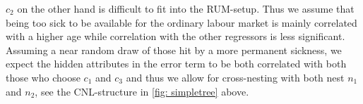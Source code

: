 $c_2$ on the other hand is difficult to fit into the RUM-setup. Thus we assume that being too sick to be available for the ordinary labour market is mainly correlated with a higher age while correlation with the other regressors is less significant. Assuming a near random draw of those hit by a more permanent sickness, we expect the hidden attributes in the error term to be both correlated with both those who choose $c_1$ and $c_3$ and thus we allow for cross-nesting with both nest $n_1$ and $n_2$, see the CNL-structure in \ref{fig: simpletree} above.
